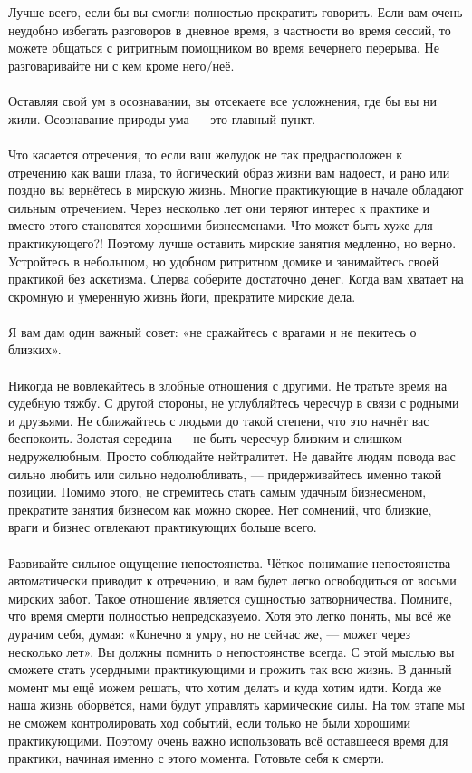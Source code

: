 \\ \\ Лучше всего, если бы вы смогли полностью прекратить говорить. Если вам очень неудобно избегать разговоров в дневное время, в частности во время сессий, то можете общаться с ритритным помощником во время вечернего перерыва. Не разговаривайте ни с кем кроме него/неё.
\\ \\ Оставляя свой ум в осознавании, вы отсекаете все усложнения, где бы вы ни жили. Осознавание природы ума — это главный пункт.
\\ \\ Что касается отречения, то если ваш желудок не так предрасположен к отречению как ваши глаза, то йогический образ жизни вам надоест, и рано или поздно вы вернётесь в мирскую жизнь. Многие практикующие в начале обладают сильным отречением. Через несколько лет они теряют интерес к практике и вместо этого становятся хорошими бизнесменами. Что может быть хуже для практикующего?! Поэтому лучше оставить мирские занятия медленно, но верно. Устройтесь в небольшом, но удобном ритритном домике и занимайтесь своей практикой без аскетизма. Сперва соберите достаточно денег. Когда вам хватает на скромную и умеренную жизнь йоги, прекратите мирские дела.
\\ \\ Я вам дам один важный совет: «не сражайтесь с врагами и не пекитесь о близких».
\\ \\ Никогда не вовлекайтесь в злобные отношения с другими. Не тратьте время на судебную тяжбу. С другой стороны, не углубляйтесь чересчур в связи с родными и друзьями. Не сближайтесь с людьми до такой степени, что это начнёт вас беспокоить. Золотая середина — не быть чересчур близким и слишком недружелюбным. Просто соблюдайте нейтралитет. Не давайте людям повода вас сильно любить или сильно недолюбливать, — придерживайтесь именно такой позиции. Помимо этого, не стремитесь стать самым удачным бизнесменом, прекратите занятия бизнесом как можно скорее. Нет сомнений, что близкие, враги и бизнес отвлекают практикующих больше всего.
\\ \\ Развивайте сильное ощущение непостоянства. Чёткое понимание непостоянства автоматически приводит к отречению, и вам будет легко освободиться от восьми мирских забот. Такое отношение является сущностью затворничества. Помните, что время смерти полностью непредсказуемо. Хотя это легко понять, мы всё же дурачим себя, думая: «Конечно я умру, но не сейчас же, — может через несколько лет». Вы должны помнить о непостоянстве всегда. С этой мыслью вы сможете стать усердными практикующими и прожить так всю жизнь. В данный момент мы ещё можем решать, что хотим делать и куда хотим идти. Когда же наша жизнь оборвётся, нами будут управлять кармические силы. На том этапе мы не сможем контролировать ход событий, если только не были хорошими практикующими. Поэтому очень важно использовать всё оставшееся время для практики, начиная именно с этого момента. Готовьте себя к смерти.
